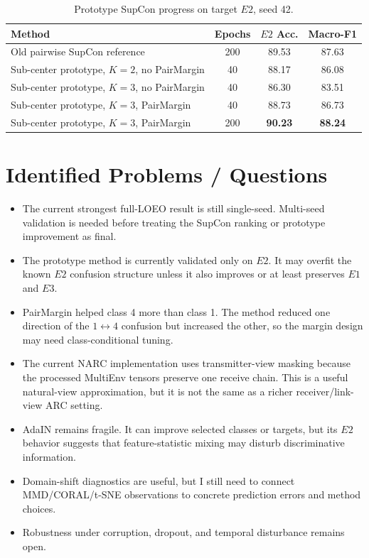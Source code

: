 \documentclass[11pt]{article}
\begin{document}
\begin{table}[h]
\centering
\caption{Prototype SupCon progress on target $E2$, seed 42.}
\small
\begin{tabular}{lccc}
\toprule
Method & Epochs & $E2$ Acc. & Macro-F1 \\
\midrule
Old pairwise SupCon reference & 200 & 89.53 & 87.63 \\
Sub-center prototype, $K=2$, no PairMargin & 40 & 88.17 & 86.08 \\
Sub-center prototype, $K=3$, no PairMargin & 40 & 86.30 & 83.51 \\
Sub-center prototype, $K=3$, PairMargin & 40 & 88.73 & 86.73 \\
Sub-center prototype, $K=3$, PairMargin & 200 & \textbf{90.23} & \textbf{88.24} \\
\bottomrule
\end{tabular}
\end{table}

\section{Identified Problems / Questions}

\begin{itemize}[leftmargin=*]
    \item The current strongest full-LOEO result is still single-seed. Multi-seed validation is needed before treating the SupCon ranking or prototype improvement as final.
    \item The prototype method is currently validated only on $E2$. It may overfit the known $E2$ confusion structure unless it also improves or at least preserves $E1$ and $E3$.
    \item PairMargin helped class 4 more than class 1. The method reduced one direction of the $1 \leftrightarrow 4$ confusion but increased the other, so the margin design may need class-conditional tuning.
    \item The current NARC implementation uses transmitter-view masking because the processed MultiEnv tensors preserve one receive chain. This is a useful natural-view approximation, but it is not the same as a richer receiver/link-view ARC setting.
    \item AdaIN remains fragile. It can improve selected classes or targets, but its $E2$ behavior suggests that feature-statistic mixing may disturb discriminative information.
    \item Domain-shift diagnostics are useful, but I still need to connect MMD/CORAL/t-SNE observations to concrete prediction errors and method choices.
    \item Robustness under corruption, dropout, and temporal disturbance remains open.
\end{itemize}
\end{document}

